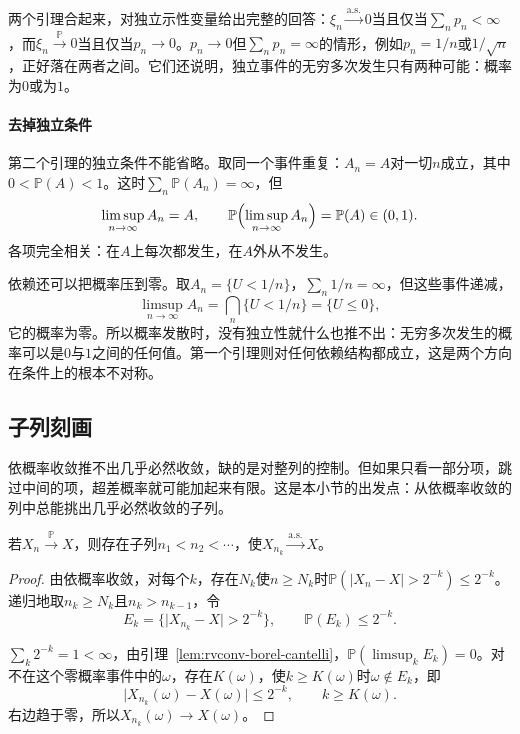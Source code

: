 两个引理合起来，对独立示性变量给出完整的回答：$\xi_n\xrightarrow{\mathrm{a.s.}}0$当且仅当$\sum_np_n<\infty$，而$\xi_n\xrightarrow{\mathbb{P}}0$当且仅当$p_n\to0$。$p_n\to0$但$\sum_np_n=\infty$的情形，例如$p_n=1/n$或$1/\sqrt{n}$，正好落在两者之间。它们还说明，独立事件的无穷多次发生只有两种可能：概率为$0$或为$1$。

\paragraph{去掉独立条件}
第二个引理的独立条件不能省略。取同一个事件重复：$A_n=A$对一切$n$成立，其中$0<\mathbb{P}(A)<1$。这时$\sum_n\mathbb{P}(A_n)=\infty$，但
\[
 \limsup_{n\to\infty}A_n=A,\qquad \mathbb{P}\Bigl(\limsup_{n\to\infty}A_n\Bigr)=\mathbb{P}(A)\in(0,1) .
\]
各项完全相关：在$A$上每次都发生，在$A$外从不发生。

依赖还可以把概率压到零。取$A_n=\{U<1/n\}$，$\sum_n1/n=\infty$，但这些事件递减，
\[
 \limsup_{n\to\infty}A_n=\bigcap_{n}\{U<1/n\}=\{U\leq0\},
\]
它的概率为零。所以概率发散时，没有独立性就什么也推不出：无穷多次发生的概率可以是$0$与$1$之间的任何值。第一个引理则对任何依赖结构都成立，这是两个方向在条件上的根本不对称。

\subsection{子列刻画}
\label{sec:rvconv-subsequence}

依概率收敛推不出几乎必然收敛，缺的是对整列的控制。但如果只看一部分项，跳过中间的项，超差概率就可能加起来有限。这是本小节的出发点：从依概率收敛的列中总能挑出几乎必然收敛的子列。

\begin{theorem}[几乎必然收敛的子列]
\label{thm:rvconv-subsequence}
若$X_n\xrightarrow{\mathbb{P}}X$，则存在子列$n_1<n_2<\cdots$，使$X_{n_k}\xrightarrow{\mathrm{a.s.}}X$。
\end{theorem}

\begin{proof}
由依概率收敛，对每个$k$，存在$N_k$使$n\geq N_k$时$\mathbb{P}(\lvert X_n-X\rvert>2^{-k})\leq2^{-k}$。递归地取$n_k\geq N_k$且$n_k>n_{k-1}$，令
\[
 E_k=\bigl\{\lvert X_{n_k}-X\rvert>2^{-k}\bigr\},\qquad \mathbb{P}(E_k)\leq2^{-k} .
\]

$\sum_k2^{-k}=1<\infty$，由引理~\ref{lem:rvconv-borel-cantelli}，$\mathbb{P}(\limsup_kE_k)=0$。对不在这个零概率事件中的$\omega$，存在$K(\omega)$，使$k\geq K(\omega)$时$\omega\notin E_k$，即
\[
 \lvert X_{n_k}(\omega)-X(\omega)\rvert\leq2^{-k},\qquad k\geq K(\omega) .
\]
右边趋于零，所以$X_{n_k}(\omega)\to X(\omega)$。
\end{proof}

